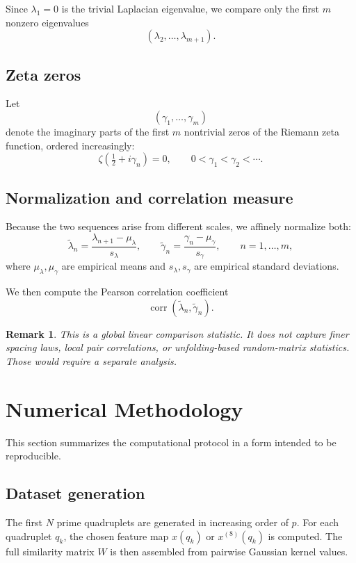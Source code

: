 \documentclass[11pt,a4paper]{article}
\newtheorem{remark}[definition]{Remark}
\newcommand{\corr}{\operatorname{corr}}
\begin{document}
	Since \(\lambda_1=0\) is the trivial Laplacian eigenvalue, we compare only the first \(m\) nonzero eigenvalues
	\[
	(\lambda_2,\dots,\lambda_{m+1}).
	\]
	
	\subsection{Zeta zeros}
	
	Let
	\[
	(\gamma_1,\dots,\gamma_m)
	\]
	denote the imaginary parts of the first \(m\) nontrivial zeros of the Riemann zeta function, ordered increasingly:
	\[
	\zeta\!\left(\tfrac12+i\gamma_n\right)=0,
	\qquad
	0<\gamma_1<\gamma_2<\cdots.
	\]
	
	\subsection{Normalization and correlation measure}
	
	Because the two sequences arise from different scales, we affinely normalize both:
	\[
	\widetilde{\lambda}_n
	=
	\frac{\lambda_{n+1}-\mu_\lambda}{s_\lambda},
	\qquad
	\widetilde{\gamma}_n
	=
	\frac{\gamma_n-\mu_\gamma}{s_\gamma},
	\qquad n=1,\dots,m,
	\]
	where \(\mu_\lambda,\mu_\gamma\) are empirical means and \(s_\lambda,s_\gamma\) are empirical standard deviations.
	
	We then compute the Pearson correlation coefficient
	\[
	\corr(\widetilde{\lambda}_n,\widetilde{\gamma}_n).
	\]
	
	\begin{remark}
		This is a global linear comparison statistic. It does not capture finer spacing laws, local pair correlations, or unfolding-based random-matrix statistics. Those would require a separate analysis.
	\end{remark}
	
	\section{Numerical Methodology}
	
	This section summarizes the computational protocol in a form intended to be reproducible.
	
	\subsection{Dataset generation}
	
	The first \(N\) prime quadruplets are generated in increasing order of \(p\). For each quadruplet \(q_k\), the chosen feature map \(x(q_k)\) or \(x^{(8)}(q_k)\) is computed. The full similarity matrix \(W\) is then assembled from pairwise Gaussian kernel values.
	
\end{document}

